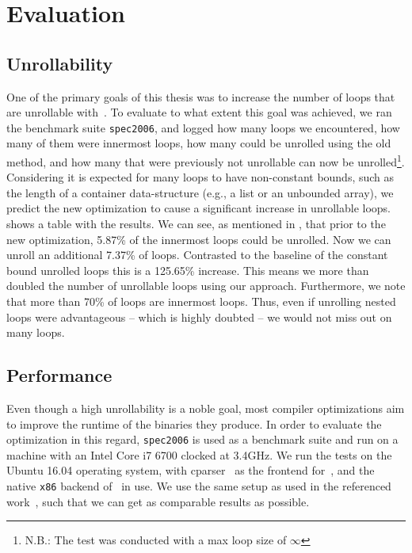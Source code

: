 \chapter{Evaluation}\label{sec:eval}

\section{Unrollability}\label{sec:eval:unrollability}

One of the primary goals of this thesis was to increase the number of loops that are unrollable with~\libFIRM.
To evaluate to what extent this goal was achieved, we ran the benchmark suite \texttt{spec2006}, and logged how many loops we encountered, how many of them were innermost loops, how many could be unrolled using the old method, and how many that were previously not unrollable can now be unrolled\footnote{N.B.: The test was conducted with a max loop size of $\infty$}.
Considering it is expected for many loops to have non-constant bounds, such as the length of a container data-structure (e.g., a list or an unbounded array), we predict the new optimization to cause a significant increase in unrollable loops.
 shows a table with the results.
We can see, as mentioned in , that prior to the new optimization, 5.87\% of the innermost loops could be unrolled.
Now we can unroll an additional 7.37\% of loops.
Contrasted to the baseline of the constant bound unrolled loops this is a 125.65\% increase.
This means we more than doubled the number of unrollable loops using our approach.
Furthermore, we note that more than 70\% of loops are innermost loops.
Thus, even if unrolling nested loops were advantageous -- which is highly doubted -- we would not miss out on many loops.




\section{Performance}\label{sec:eval:perf}

Even though a high unrollability is a noble goal, most compiler optimizations aim to improve the runtime of the binaries they produce.
In order to evaluate the optimization in this regard, \texttt{spec2006} is used as a benchmark suite and run on a machine with an Intel Core i7 6700 clocked at 3.4GHz.
We run the tests on the Ubuntu 16.04 operating system, with cparser~\cite{cparser} as the frontend for~\libFIRM, and the native \texttt{x86} backend of~\libFIRM{} in use.
We use the same setup as used in the referenced work~\cite{aebi18bachelorarbeit}, such that we can get as comparable results as possible.

